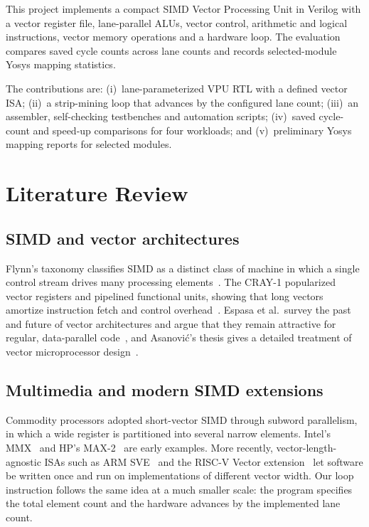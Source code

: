\documentclass[conference]{IEEEtran}
\begin{document}
This project implements a compact SIMD Vector Processing Unit in Verilog with a vector register file, lane-parallel ALUs, vector control, arithmetic and logical instructions, vector memory operations and a hardware loop. The evaluation compares saved cycle counts across lane counts and records selected-module Yosys mapping statistics.

The contributions are: (i)~lane-parameterized VPU RTL with a defined vector ISA; (ii)~a strip-mining loop that advances by the configured lane count; (iii)~an assembler, self-checking testbenches and automation scripts; (iv)~saved cycle-count and speed-up comparisons for four workloads; and (v)~preliminary Yosys mapping reports for selected modules.

\section{Literature Review}
\subsection{SIMD and vector architectures}
Flynn's taxonomy classifies SIMD as a distinct class of machine in which a single control stream drives many processing elements~\cite{flynn1966}. The CRAY-1 popularized vector registers and pipelined functional units, showing that long vectors amortize instruction fetch and control overhead~\cite{russell1978}. Espasa et al.\ survey the past and future of vector architectures and argue that they remain attractive for regular, data-parallel code~\cite{espasa1998}, and Asanovi\'c's thesis gives a detailed treatment of vector microprocessor design~\cite{asanovic1998}.

\subsection{Multimedia and modern SIMD extensions}
Commodity processors adopted short-vector SIMD through subword parallelism, in which a wide register is partitioned into several narrow elements. Intel's MMX~\cite{peleg1996} and HP's MAX-2~\cite{lee1996} are early examples. More recently, vector-length-agnostic ISAs such as ARM SVE~\cite{stephens2017} and the RISC-V Vector extension~\cite{rvv2021} let software be written once and run on implementations of different vector width. Our loop instruction follows the same idea at a much smaller scale: the program specifies the total element count and the hardware advances by the implemented lane count.
\end{document}
